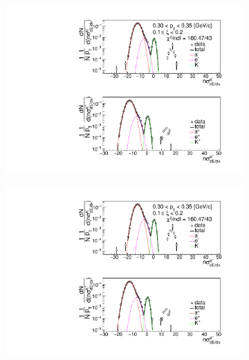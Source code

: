 \begin{figure}[h!]
\begin{subfigure}{.3\textwidth}
	\end{subfigure}
	\begin{subfigure}{.33\textwidth}
		\includegraphics[width=\linewidth, page=4]{chapters/chrgSTAR/img/dEdx/fit2019_thirdStep_1_2.pdf}
	\end{subfigure}
	\begin{subfigure}{.33\textwidth}
		\includegraphics[width=\linewidth, page=5]{chapters/chrgSTAR/img/dEdx/fit2019_thirdStep_1_2.pdf}
	\end{subfigure}
	\begin{subfigure}{.3\textwidth}

\end{subfigure}
\end{figure}

